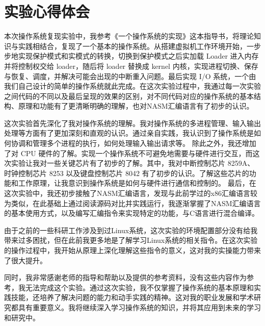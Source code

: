\chapter{实验心得体会}\label{cha:latex-brief-intro}

本次操作系统复现实验中，我参考《一个操作系统的实现》\cite{于渊2009orange}这本指导书，将理论知识与实践相结合，复现了一个基本的操作系统。从搭建虚拟机工作环境开始，一步步地实现保护模式和实模式的转换，切换到保护模式之后实加载 Loader 进入内存并将控制权交给 loader，随后将 loader 替换成 kernel 内核，实现进程切换、保存与恢复、调度，并解决可能会出现的中断重入问题。最后实现 I/O 系统，一个由我们自己设计的简单的操作系统就此完成。在这次实验过程中，我通过每一次实验之间代码的不同以及最后呈现的效果的区别，对不同代码对应的操作系统的基本结构、原理和功能有了更清晰明确的理解，也对NASM汇编语言有了初步的认识。\par
这次实验首先深化了我对操作系统的理解。我对操作系统的多进程管理、输入输出处理等方面有了更加深刻和直观的认识。通过亲自实践，我认识到了操作系统是如何协调和管理多个进程的执行，如何处理输入输出请求等。
除此之外，我还增加了对 CPU 硬件的了解。实现一个操作系统不可避免地需要与硬件进行交互，而这次实验让我对一些关键芯片有了初步的了解。其中，我对中断控制芯片 8259A、时钟控制芯片 8253 以及键盘控制芯片 8042 有了初步的认识。了解这些芯片的功能和工作原理，让我意识到操作系统是如何与硬件进行通信和控制的。
最后，在这次实验中，我还初步接触了NASM汇编语言，发现与此前学过的x86汇编语言较为类似，在此基础上通过阅读源码对比并实践运行，我逐渐掌握了NASM汇编语言的基本使用方式，以及编写汇编指令来实现特定的功能，与C语言进行混合编译。\par
由于之前的一些科研工作涉及到过Linux系统，这次实验的环境配置部分没有给我带来过多困扰，但在此前我更多地是了解学习Linux系统的相关指令。在这次实验的操作过程中，我开始从原理上深化理解这些指令的意义，这对我的实操能力带来了很大提升。\par
同时，我非常感谢老师的指导和帮助以及提供的参考资料\cite{于渊2009orange}\cite{mit}，没有这些内容作为参考，我无法完成这个实验。通过这次实验，我不仅掌握了操作系统的基本原理和实践技能，还培养了解决问题的能力和动手实践的精神。这对我的职业发展和学术研究都具有重要意义。我将继续深入学习操作系统的知识，并将其应用到未来的学习和研究中。

